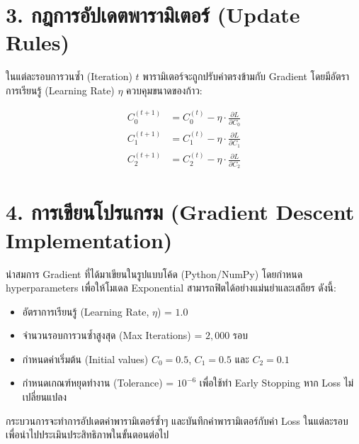 \documentclass[12pt,a4paper]{article}
\begin{document}
\section*{3. กฎการอัปเดตพารามิเตอร์ (Update Rules)}

ในแต่ละรอบการวนซ้ำ (Iteration) $t$ พารามิเตอร์จะถูกปรับค่าตรงข้ามกับ Gradient โดยมีอัตราการเรียนรู้ (Learning Rate) $\eta$ ควบคุมขนาดของก้าว:

\begin{ansbox}
\begin{align*}
  C_0^{(t+1)} &= C_0^{(t)} - \eta \cdot \frac{\partial L}{\partial C_0} \\
  C_1^{(t+1)} &= C_1^{(t)} - \eta \cdot \frac{\partial L}{\partial C_1} \\
  C_2^{(t+1)} &= C_2^{(t)} - \eta \cdot \frac{\partial L}{\partial C_2}
\end{align*}
\end{ansbox}

\section*{4. การเขียนโปรแกรม (Gradient Descent Implementation)}

นำสมการ Gradient ที่ได้มาเขียนในรูปแบบโค้ด (Python/NumPy) โดยกำหนด hyperparameters เพื่อให้โมเดล Exponential สามารถฟิตได้อย่างแม่นยำและเสถียร ดังนี้:
\begin{itemize}[noitemsep, topsep=2pt]
  \item อัตราการเรียนรู้ (Learning Rate, $\eta$) = $1.0$
  \item จำนวนรอบการวนซ้ำสูงสุด (Max Iterations) = $2,000$ รอบ
  \item กำหนดค่าเริ่มต้น (Initial values) $C_0 = 0.5$, $C_1 = 0.5$ และ $C_2 = 0.1$
  \item กำหนดเกณฑ์หยุดทำงาน (Tolerance) = $10^{-6}$ เพื่อใช้ทำ Early Stopping หาก Loss ไม่เปลี่ยนแปลง
\end{itemize}

กระบวนการจะทำการอัปเดตค่าพารามิเตอร์ซ้ำๆ และบันทึกค่าพารามิเตอร์กับค่า Loss ในแต่ละรอบ เพื่อนำไปประเมินประสิทธิภาพในขั้นตอนต่อไป

\end{document}
